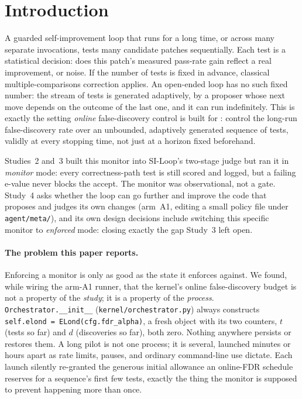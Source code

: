 \documentclass[11pt]{article}
\begin{document}
\section{Introduction}
\label{sec:intro}

A guarded self-improvement loop that runs for a long time, or across many separate invocations, tests many candidate patches sequentially. Each test is a statistical decision: does this patch's measured pass-rate gain reflect a real improvement, or noise. If the number of tests is fixed in advance, classical multiple-comparisons correction applies. An open-ended loop has no such fixed number: the stream of tests is generated adaptively, by a proposer whose next move depends on the outcome of the last one, and it can run indefinitely. This is exactly the setting \emph{online} false-discovery control is built for \citep{xu2024elond,ramdas2023gtsavi}: control the long-run false-discovery rate over an unbounded, adaptively generated sequence of tests, validly at every stopping time, not just at a horizon fixed beforehand.

Studies~2 and~3 \citep{ouadoukou2026study2,ouadoukou2026study3} built this monitor into SI-Loop's two-stage judge but ran it in \emph{monitor} mode: every correctness-path test is still scored and logged, but a failing e-value never blocks the accept. The monitor was observational, not a gate. Study~4 asks whether the loop can go further and improve the code that proposes and judges its own changes (arm~A1, editing a small policy file under \texttt{agent/meta/}), and its own design decisions include switching this specific monitor to \emph{enforced} mode: closing exactly the gap Study~3 left open.

\paragraph{The problem this paper reports.} Enforcing a monitor is only as good as the state it enforces against. We found, while wiring the arm-A1 runner, that the kernel's online false-discovery budget is not a property of the \emph{study}; it is a property of the \emph{process}. \texttt{Orchestrator.\_\_init\_\_} (\texttt{kernel/orchestrator.py}) always constructs \texttt{self.elond = ELond(cfg.fdr\_alpha)}, a fresh object with its two counters, $t$ (tests so far) and $d$ (discoveries so far), both zero. Nothing anywhere persists or restores them. A long pilot is not one process; it is several, launched minutes or hours apart as rate limits, pauses, and ordinary command-line use dictate. Each launch silently re-granted the generous initial allowance an online-FDR schedule reserves for a sequence's first few tests, exactly the thing the monitor is supposed to prevent happening more than once.
\end{document}
